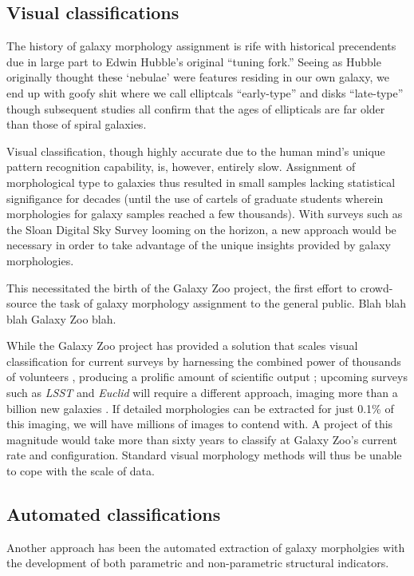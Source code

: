 \subsection{Visual classifications}
The history of galaxy morphology assignment is rife with historical precendents due in large part to Edwin Hubble's original ``tuning fork.'' Seeing as Hubble originally thought these `nebulae' were features residing in our own galaxy, we end up with goofy shit where we call elliptcals ``early-type'' and disks ``late-type'' though subsequent studies all confirm that the ages of ellipticals are far older than those of spiral galaxies. 

Visual classification, though highly accurate due to the human mind's unique pattern recognition capability, is, however, entirely slow. Assignment of morphological type to galaxies thus resulted in small samples lacking statistical signifigance for decades (until the use of cartels of graduate students wherein morphologies for galaxy samples reached a few thousands). With surveys such as the Sloan Digital Sky Survey looming on the horizon, a new approach would be necessary in order to take advantage of the unique insights provided by galaxy morphologies.

This necessitated the birth of the Galaxy Zoo project, the first effort to crowd-source the task of galaxy morphology assignment to the general public. Blah blah blah Galaxy Zoo blah. 

While the Galaxy Zoo project has provided a solution that scales visual classification for current surveys  by harnessing the combined power of thousands of volunteers \citep{Lintott2008, Lintott2011, Willett2013, Willett2017, Simmons2017},  producing a prolific amount of scientific output \citep[e.g.,][]{Land2008, Bamford2009, Darg2010, Schawinski2014, Galloway2015, Smethurst2016}; upcoming surveys such as \textit{LSST} and \textit{Euclid} will require a different approach, imaging more than a billion new galaxies  \citep{LSST, Euclid}.  If detailed morphologies can be extracted for just  0.1\% of this imaging, we will have millions of images to contend with. A project of this magnitude would take more than sixty years to classify at Galaxy Zoo's current rate and configuration. Standard visual morphology 
methods will thus be unable to cope with the scale of data. 


\subsection{Automated classifications}
Another approach has been the automated extraction of galaxy morpholgies with the development of both parametric and non-parametric structural indicators. 

